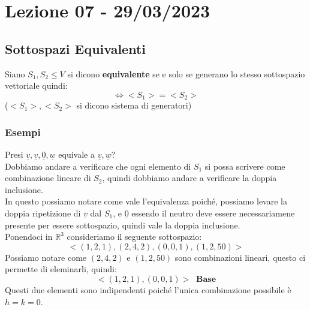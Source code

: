 \section{Lezione 07 - 29/03/2023}

\subsection{Sottospazi Equivalenti}
Siano $S_1,S_2 \le V $ si dicono \textbf{equivalente} se e solo se generano lo stesso sottospazio vettoriale quindi:
$$ \Leftrightarrow <S_1> = <S_2> $$
($<S_1>,<S_2>$ si dicono sistema di generatori)

\subsubsection{Esempi}
Presi $\underline{v}, \underline{v}, \underline{0}, \underline{w}$ equivale a $\underline{v}, \underline{w}$?\\
Dobbiamo andare a verificare che ogni elemento di $S_1$ si possa scrivere come combinazione lineare di $S_2$, quindi dobbiamo andare a verificare la doppia inclusione.\\
In questo possiamo notare come vale l'equivalenza poiché, possiamo levare la doppia ripetizione di $\underline{v}$ dal $S_1$, e $\underline{0}$ essendo il neutro deve essere necessariamene presente per essere sottospazio, quindi vale la doppia inclusione.\\

Ponendoci in $\mathbb{R}^3$ consideriamo il seguente sottospazio:
$$ <(1,2,1),(2,4,2),(0,0,1),(1,2,50)> $$
Possiamo notare come $(2,4,2)$ e $(1,2,50)$ sono combinazioni lineari, questo ci permette di eleminarli, quindi:
$$ <(1,2,1),(0,0,1)> \; \; \textbf{Base}$$
Questi due elementi sono indipendenti poiché l'unica combinazione possibile è $h=k=0$.\\

